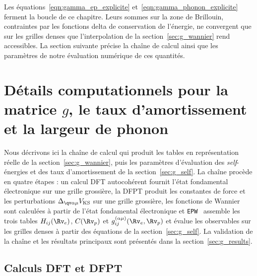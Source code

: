 Les équations~\eqref{eqn:gamma_ep_explicite} et~\eqref{eqn:gamma_phonon_explicite} ferment la boucle de ce chapitre. Leurs sommes sur la zone de Brillouin, contraintes par les fonctions delta de conservation de l'énergie, ne convergent que sur les grilles denses que l'interpolation de la section~\ref{sec:g_wannier} rend accessibles. La section suivante précise la chaîne de calcul ainsi que les paramètres de notre évaluation numérique de ces quantités.

\section{Détails computationnels pour la matrice $g$, le taux d'amortissement et la largeur de phonon}\label{sec:g_détails}

Nous décrivons ici la chaîne de calcul qui produit les tables en représentation réelle de la section~\ref{sec:g_wannier}, puis les paramètres d'évaluation des \textit{self}-énergies et des taux d'amortissement de la section~\ref{sec:g_self}. La chaîne procède en quatre étapes : un calcul DFT autocohérent fournit l'état fondamental électronique sur une grille grossière, la DFPT produit les constantes de force et les perturbations $\Delta_{\qv\alpha\mu}V_\text{KS}$ sur une grille grossière, les fonctions de Wannier sont calculées à partir de l'état fondamental électronique et \texttt{EPW}~\cite{ponceEPWElectronphononCoupling2016,leeElectronPhononPhysics2023a} assemble les trois tables $H_{ij}(\Rv_e)$, $C(\Rv_p)$ et $g_{ij}^{(\alpha\mu)}(\Rv_e,\Rv_p)$ et évalue les observables sur les grilles denses à partir des équations de la section~\ref{sec:g_self}. La validation de la chaîne et les résultats principaux sont présentés dans la section~\ref{sec:g_results}.

\subsection{Calculs DFT et DFPT}

